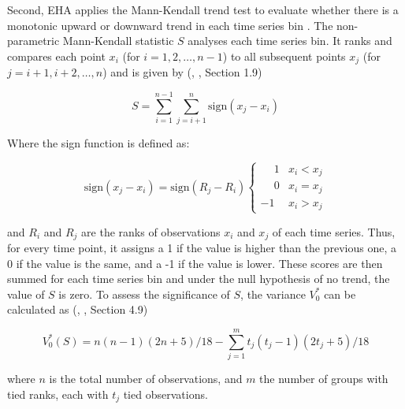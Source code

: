 \bigskip

Second, EHA applies the Mann-Kendall trend test to evaluate whether there is a monotonic upward or
downward trend in each time series bin \citep{mann1945nonparametric,kendall1990rank}. The
non-parametric Mann-Kendall statistic \(S\) analyses each time series bin. It ranks and compares
each point \( x_i \) (for \( i = 1, 2, \ldots, n-1 \)) to all subsequent points \( x_j \) (for \( j
= i+1, i+2, \ldots, n \)) and is given by (\citeauthor{kendall1990rank},
\citeyear{kendall1990rank}, Section 1.9)

\begin{equation}
	S = \sum_{i=1}^{n-1} \sum_{j=i+1}^{n} \text{sign}(x_j - x_i)
\end{equation}

\bigskip

Where the sign function is defined as:

\begin{equation}
	\text{sign}(x_j - x_i) = \text{sign}(R_j - R_i)
	\begin{cases}
		\phantom{-}1 & x_i < x_j \\
		\phantom{-}0 & x_i = x_j \\
		-1           & x_i > x_j
	\end{cases}
\end{equation}

\bigskip

and \(R_i\) and \(R_j\) are the ranks of observations \(x_i\) and \(x_j\) of each time series.
Thus, for every time point, it assigns a 1 if the value is higher than the previous one, a 0 if the
value is the same, and a -1 if the value is lower. These scores are then summed for each time
series bin and under the null hypothesis of no trend, the value of \(S\) is zero. To assess the
significance of \(S\), the variance \(V^*_0\) can be calculated as (\citeauthor{kendall1990rank},
\citeyear{kendall1990rank}, Section 4.9)

\begin{equation}
	V^*_0 (S) = n(n - 1)(2n + 5) / 18 - \sum_{j=1}^{m} t_j(t_j - 1)(2t_j + 5) /18
\end{equation}

\bigskip

where \(n\) is the total number of observations, and \(m\) the number of groups with tied ranks,
each with \(t_j\) tied observations.

